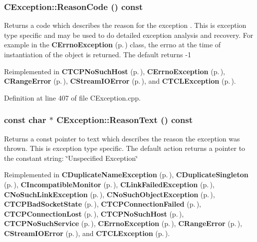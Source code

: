 \subsubsection{ CException::Reason\-Code () const\hspace{0.3cm}{\tt  [virtual]}}\label{classCException_a9}


Returns a code which describes the reason for the exception . This is exception type specific and may be used to do detailed exception analysis and recovery. For example in the {\bf CErrno\-Exception} {\rm (p.\,\pageref{classCErrnoException})} class, the errno at the time of instantiation of the object is returned. The default returns -1 

Reimplemented in {\bf CTCPNo\-Such\-Host} {\rm (p.\,\pageref{classCTCPNoSuchHost_a8})}, {\bf CErrno\-Exception} {\rm (p.\,\pageref{classCErrnoException_a8})}, {\bf CRange\-Error} {\rm (p.\,\pageref{classCRangeError_a10})}, {\bf CStream\-IOError} {\rm (p.\,\pageref{classCStreamIOError_a9})}, and {\bf CTCLException} {\rm (p.\,\pageref{classCTCLException_a14})}.

Definition at line 407 of file CException.cpp.
\subsubsection{\setlength{\rightskip}{0pt plus 5cm}const char $\ast$ CException::Reason\-Text () const\hspace{0.3cm}{\tt  [virtual]}}\label{classCException_a8}


Returns a const pointer to text which describes the reason the exception was thrown. This is exception type specific. The default action returns a pointer to the constant string: \char`\"{}Unspecified Exception\char`\"{} 

Reimplemented in {\bf CDuplicate\-Name\-Exception} {\rm (p.\,\pageref{classCDuplicateNameException_a10})}, {\bf CDuplicate\-Singleton} {\rm (p.\,\pageref{classCDuplicateSingleton_a10})}, {\bf CIncompatible\-Monitor} {\rm (p.\,\pageref{classCIncompatibleMonitor_a7})}, {\bf CLink\-Failed\-Exception} {\rm (p.\,\pageref{classCLinkFailedException_a12})}, {\bf CNo\-Such\-Link\-Exception} {\rm (p.\,\pageref{classCNoSuchLinkException_a12})}, {\bf CNo\-Such\-Object\-Exception} {\rm (p.\,\pageref{classCNoSuchObjectException_a10})}, {\bf CTCPBad\-Socket\-State} {\rm (p.\,\pageref{classCTCPBadSocketState_a7})}, {\bf CTCPConnection\-Failed} {\rm (p.\,\pageref{classCTCPConnectionFailed_a7})}, {\bf CTCPConnection\-Lost} {\rm (p.\,\pageref{classCTCPConnectionLost_a7})}, {\bf CTCPNo\-Such\-Host} {\rm (p.\,\pageref{classCTCPNoSuchHost_a7})}, {\bf CTCPNo\-Such\-Service} {\rm (p.\,\pageref{classCTCPNoSuchService_a6})}, {\bf CErrno\-Exception} {\rm (p.\,\pageref{classCErrnoException_a7})}, {\bf CRange\-Error} {\rm (p.\,\pageref{classCRangeError_a9})}, {\bf CStream\-IOError} {\rm (p.\,\pageref{classCStreamIOError_a8})}, and {\bf CTCLException} {\rm (p.\,\pageref{classCTCLException_a13})}.

